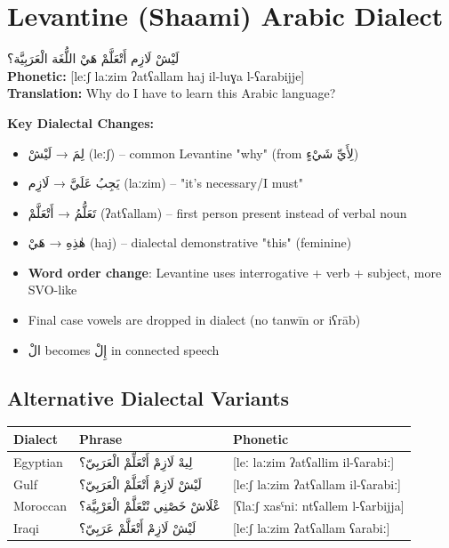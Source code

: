 \documentclass[letterpaper,12pt]{article}
\begin{document}
\section{Levantine (Shaami) Arabic Dialect}

\begin{tcolorbox}[colback=white,colframe=dialectcolor,title=\textbf{Levantine Version},breakable]
\textarabic{لَيْشْ لَازِم أَتْعَلَّمْ هَيْ اللُّغَة الْعَرَبِيَّة؟}\\
\textbf{Phonetic:} [leːʃ laːzim ʔatʕallam haj il-luɣa l-ʕarabijje]\\
\textbf{Translation:} Why do I have to learn this Arabic language?
\end{tcolorbox}

\textbf{Key Dialectal Changes:}
\begin{itemize}
\item \textarabic{لِمَ} → \textarabic{لَيْشْ} (leːʃ) – common Levantine "why" (from \textarabic{لِأَيِّ شَيْءٍ})
\item \textarabic{يَجِبُ عَلَيَّ} → \textarabic{لَازِم} (laːzim) – "it's necessary/I must"
\item \textarabic{تَعَلُّمُ} → \textarabic{أَتْعَلَّمْ} (ʔatʕallam) – first person present instead of verbal noun
\item \textarabic{هٰذِهِ} → \textarabic{هَيْ} (haj) – dialectal demonstrative "this" (feminine)
\item \textbf{Word order change}: Levantine uses interrogative + verb + subject, more SVO-like
\item Final case vowels are dropped in dialect (no tanwīn or iʕrāb)
\item \textarabic{الْ} becomes \textarabic{إِلْ} in connected speech
\end{itemize}

\subsection{Alternative Dialectal Variants}

\begin{tabular}{|l|l|l|}
\hline
\textbf{Dialect} & \textbf{Phrase} & \textbf{Phonetic} \\
\hline
Egyptian & \textarabic{لِيهْ لَازِمْ أَتْعَلِّمْ الْعَرَبِيّ؟} & [leː laːzim ʔatʕallim il-ʕarabiː] \\
\hline
Gulf & \textarabic{لَيْشْ لَازِمْ أَتْعَلَّمْ الْعَرَبِيّ؟} & [leːʃ laːzim ʔatʕallam il-ʕarabiː] \\
\hline
Moroccan & \textarabic{عْلَاشْ خَصْنِي نْتْعَلَّمْ الْعَرْبِيَّة؟} & [ʕlaːʃ xasˤniː ntʕallem l-ʕarbijja] \\
\hline
Iraqi & \textarabic{لَيْشْ لَازِمْ أَتْعَلَّمْ عَرَبِيّ؟} & [leːʃ laːzim ʔatʕallam ʕarabiː] \\
\hline
\end{tabular}
\end{document}
